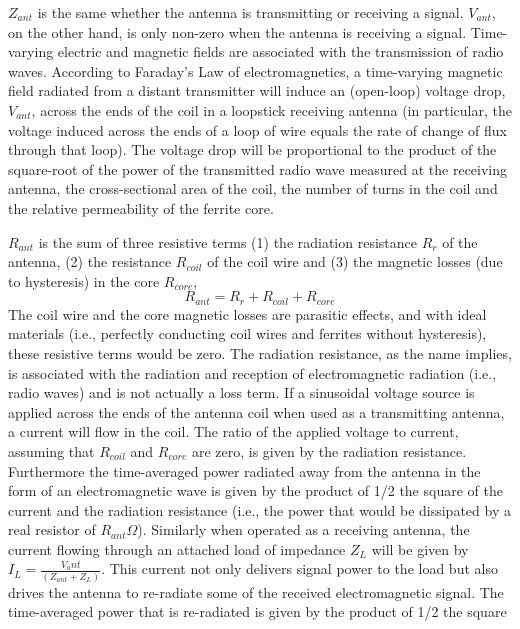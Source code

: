 \documentclass[12pt]{article}
\begin{document}
\par $Z_{ant}$ is the same whether the antenna is transmitting or receiving a signal. $V_{ant}$, on the other hand, is only
non-zero when the antenna is receiving a signal. Time-varying electric and magnetic fields are associated with
the transmission of radio waves. According to Faraday’s Law of electromagnetics, a time-varying magnetic
field radiated from a distant transmitter will induce an (open-loop) voltage drop, $V_{ant}$, across the ends of
the coil in a loopstick receiving antenna (in particular, the voltage induced across the ends of a loop of
wire equals the rate of change of flux through that loop). The voltage drop will be proportional to the
product of the square-root of the power of the transmitted radio wave measured at the receiving antenna,
the cross-sectional area of the coil, the number of turns in the coil and the relative permeability of the ferrite
core.
\par $R_{ant}$ is the sum of three resistive terms (1) the radiation resistance $R_r$ of the antenna, (2) the resistance
$R_{coil}$ of the coil wire and (3) the magnetic losses (due to hysteresis) in the core $R_{core}$,
\begin{equation}
R_{ant}=R_r+R_{coil}+R_{core}
\end{equation}
The coil wire and the core magnetic losses are parasitic effects, and with ideal materials (i.e., perfectly
conducting coil wires and ferrites without hysteresis), these resistive terms would be zero. The radiation resistance, as the name implies, is associated with the radiation and reception of electromagnetic radiation
(i.e., radio waves) and is not actually a loss term. If a sinusoidal voltage source is applied across the ends
of the antenna coil when used as a transmitting antenna, a current will flow in the coil. The ratio of the
applied voltage to current, assuming that $R_{coil}$ and $R_{core}$ are zero, is given by the radiation resistance.
Furthermore the time-averaged power radiated away from the antenna in the form of an electromagnetic
wave is given by the product of 1/2 the square of the current and the radiation resistance (i.e., the power that
would be dissipated by a real resistor of $R_{ant}\Omega$). Similarly when operated as a receiving antenna, the
current flowing through an attached load of impedance $Z_L$ will be given by $I_L= \frac{V_ant}{(Z_{ant}+Z_L)}$. This current
not only delivers signal power to the load but also drives the antenna to re-radiate some of the received
electromagnetic signal. The time-averaged power that is re-radiated is given by the product of 1/2 the square
\end{document}
